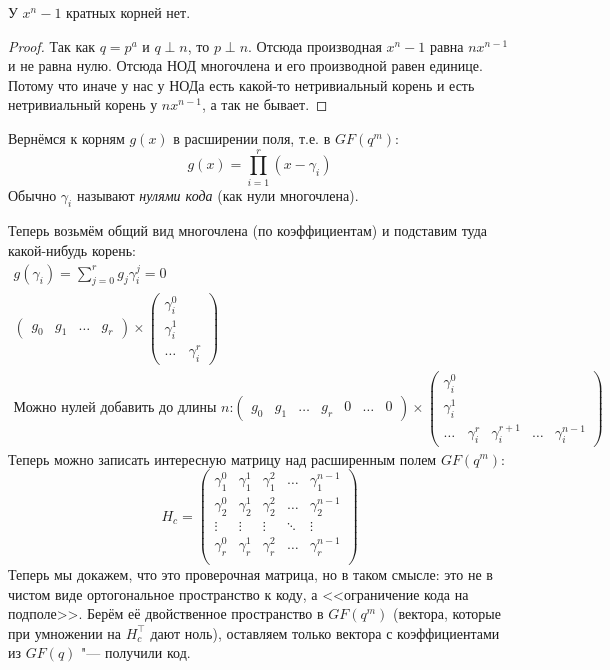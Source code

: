 \begin{lemma}
	У $x^n-1$ кратных корней нет.
\end{lemma}
\begin{proof}
	Так как $q=p^a$ и $q \perp n$, то $p \perp n$.
	Отсюда производная $x^n-1$ равна $nx^{n-1}$ и не равна нулю.
	Отсюда НОД многочлена и его производной равен единице.
	Потому что иначе у нас у НОДа есть какой-то нетривиальный корень
	и есть нетривиальный корень у $nx^{n-1}$, а так не бывает.
\end{proof}

Вернёмся к корням $g(x)$ в расширении поля, т.е. в $GF(q^m)$:
\[
g(x) = \prod\limits_{i=1}^r (x-\gamma_i)
\]
Обычно $\gamma_i$ называют \textit{нулями кода} (как нули многочлена).

Теперь возьмём общий вид многочлена (по коэффициентам) и подставим туда какой-нибудь корень:
\begin{gather*}
g(\gamma_i) = \sum\limits_{j=0}^r g_j \gamma_i^j = 0
\\
\begin{pmatrix}
g_0 & g_1 & \dots & g_r
\end{pmatrix}
\times
\begin{pmatrix}
\gamma_i^0 \\ \gamma_i^1 \\ \dots & \gamma_i^r
\end{pmatrix}
\\
\text{Можно нулей добавить до длины $n$:}
\begin{pmatrix}
g_0 & g_1 & \dots & g_r & 0 & \dots & 0
\end{pmatrix}
\times
\begin{pmatrix}
\gamma_i^0 \\ \gamma_i^1 \\ \dots & \gamma_i^r & \gamma_i^{r+1} & \dots & \gamma_i^{n-1}
\end{pmatrix}
\end{gather*}
Теперь можно записать интересную матрицу над расширенным полем $GF(q^m)$:
\[
H_c = \begin{pmatrix}
\gamma_1^0 & \gamma_1^1 & \gamma_1^2 & \dots & \gamma_1^{n-1} \\
\gamma_2^0 & \gamma_2^1 & \gamma_2^2 & \dots & \gamma_2^{n-1} \\
\vdots & \vdots & \vdots & \ddots & \vdots \\
\gamma_r^0 & \gamma_r^1 & \gamma_r^2 & \dots & \gamma_r^{n-1} \\
\end{pmatrix}
\]
Теперь мы докажем, что это проверочная матрица, но в таком смысле:
это не в чистом виде ортогональное пространство к коду,
а <<ограничение кода на подполе>>.
Берём её двойственное пространство в $GF(q^m)$ (вектора, которые при умножении
на $H_c^\top$ дают ноль), оставляем только вектора с коэффициентами из $GF(q)$ "--- получили код.

